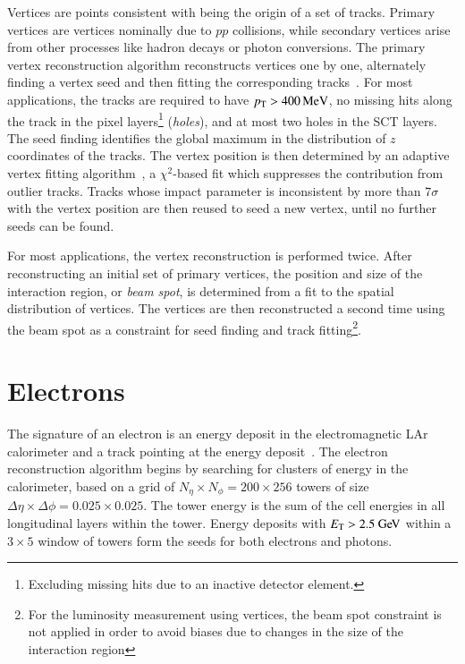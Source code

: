 Vertices are points consistent with being the origin of a set of tracks. Primary vertices are vertices nominally due to $pp$ collisions, while secondary vertices arise from other processes like hadron decays or photon conversions. The primary vertex reconstruction algorithm reconstructs vertices one by one, alternately finding a vertex seed and then fitting the corresponding tracks~\cite{TheATLASCollaboration:2010wy,TheATLASCollaboration:2012tja}. For most applications, the tracks are required to have $p_{\text{T}}>\SI{400}{\mega\electronvolt}$, no missing hits along the track in the pixel layers\footnote{Excluding missing hits due to an inactive detector element.} (\emph{holes}), and at most two holes in the SCT layers. The seed finding identifies the global maximum in the distribution of $z$ coordinates of the tracks. The vertex position is then determined by an adaptive vertex fitting algorithm~\cite{Waltenberger:2007hz}, a $\chi^2$-based fit which suppresses the contribution from outlier tracks. Tracks whose impact parameter is inconsistent by more than $7\sigma$ with the vertex position are then reused to seed a new vertex, until no further seeds can be found. 

For most applications, the vertex reconstruction is performed twice. After reconstructing an initial set of primary vertices, the position and size of the interaction region, or \emph{beam spot}, is determined from a fit to the spatial distribution of vertices. The vertices are then reconstructed a second time using the beam spot as a constraint for seed finding and track fitting\footnote{For the luminosity measurement using vertices, the beam spot constraint is not applied in order to avoid biases due to changes in the size of the interaction region}.

\section{Electrons}\label{sec:event-reconstruction-electrons}
The signature of an electron is an energy deposit in the electromagnetic LAr calorimeter and a track pointing at the energy deposit~\cite{TheATLASCollaboration:2014fu,TheATLASCollaboration:2014vz}. The electron reconstruction algorithm begins by searching for clusters of energy in the calorimeter, based on a grid of $N_{\eta}\times N_{\phi}=200\times256$ towers of size $\Delta\eta\times\Delta\phi = 0.025\times0.025$. The tower energy is the sum of the cell energies in all longitudinal layers within the tower. Energy deposits with $\Et>2.5 \GeV$ within a $3\times 5$ window of towers form the seeds for both electrons and photons.

